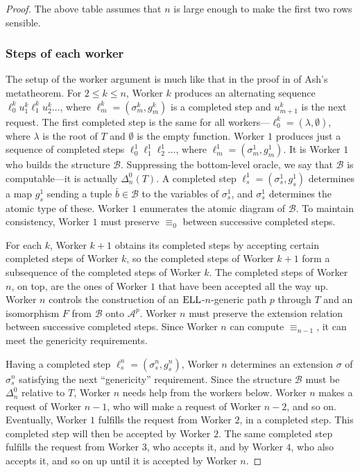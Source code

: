 \documentclass[10pt,a4paper]{article}
\newcommand{\ELL}{\textnormal{ELL}}
\theoremstyle{definition}
\begin{document}
\begin{proof}
		The above table assumes that $n$ is large enough to make the first two rows sensible.
		
		\subsubsection{Steps of each worker}
		
		The setup of the worker argument is much like that in the proof in \cite{AK00} of Ash's metatheorem. For $2\leq k\leq n$, Worker $k$ produces an alternating sequence 
		$\ell^k_0u^k_1\ell^k_1u^k_2\ldots $, where $\ell^k_m = (\sigma^k_m,g^k_m)$ is a completed step and $u^k_{m+1}$ is the next request. The first completed step is the same for all workers---$\ell^k_0 = (\lambda,\emptyset)$, where $\lambda$ is the root of $T$ and $\emptyset$ is the empty function.
		Worker $1$ produces just a sequence of completed steps $\ell^1_0\ell^1_1\ell^1_2\ldots$, where $\ell^1_m = (\sigma^1_m,g^1_m)$. It is Worker $1$ who builds the structure $\mathcal{B}$. Suppressing the bottom-level oracle, we say that $\mathcal{B}$ is computable---it is actually $\Delta^0_n(T)$. A completed step $\ell^1_s = (\sigma^1_s,g^1_s)$ determines a map $g^1_s$ sending a tuple $\bar{b}\in \mathcal{B}$ to the variables of $\sigma^1_s$, and $\sigma^1_s$ determines the atomic type of these. Worker $1$ enumerates the atomic diagram of $\mathcal{B}$. To maintain consistency, Worker $1$ must preserve $\equiv_0$ between successive completed steps.
		
		For each $k$, Worker $k+1$ obtains its completed steps by accepting certain completed steps of Worker $k$, so the completed steps of Worker $k+1$ form a subsequence of the completed steps of Worker $k$. The completed steps of Worker $n$, on top, are the ones of Worker $1$ that have been accepted all the way up. Worker $n$ controls the construction of an $\ELL$-$n$-generic path $p$ through $T$ and an isomorphism $F$ from $\mathcal{B}$ onto $\mathcal{A}^p$. Worker $n$ must preserve the extension relation between successive completed steps. Since Worker $n$ can compute $\equiv_{n-1}$, it can meet the genericity requirements. 
		
		Having a completed step $\ell_s^n = (\sigma^n_s,g^n_s)$, Worker $n$ determines an extension $\sigma$ of $\sigma^n_s$ satisfying the next ``genericity'' requirement. Since the structure $\mathcal{B}$ must be $\Delta^0_n$ relative to $T$, Worker $n$ needs help from the workers below. Worker $n$ makes a request of Worker $n-1$, who will make a request of Worker $n-2$, and so on. Eventually, Worker $1$ fulfills the request from Worker $2$, in a completed step. This completed step will then be accepted by Worker $2$. The same completed step fulfills the request from Worker $3$, who accepts it, and by Worker $4$, who also accepts it, and so on up until it is accepted by Worker $n$. 
		

\end{proof}
\end{document}
